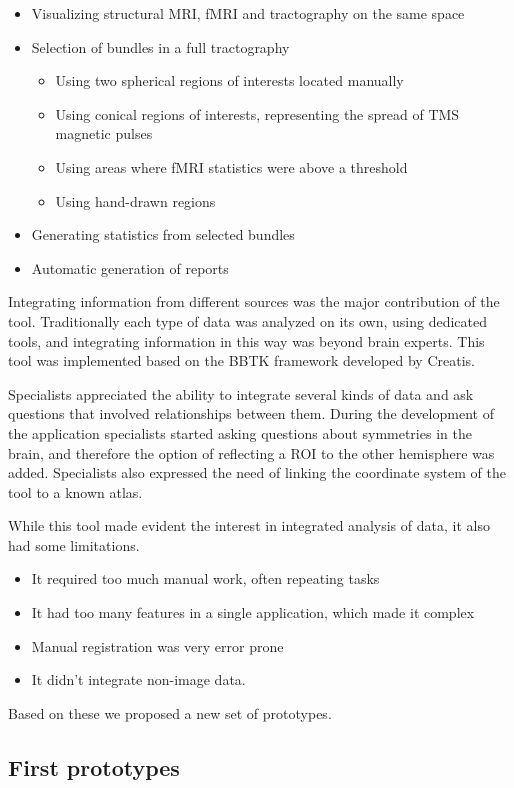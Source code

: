 \begin{itemize}
\item Visualizing structural MRI, fMRI and tractography on the same space
\item Selection of bundles in a full tractography
\begin{itemize}
\item Using two spherical regions of interests located manually
\item Using conical regions of interests, representing the spread of TMS magnetic pulses
\item Using areas where fMRI statistics were above a threshold
\item Using hand-drawn regions
\end{itemize}
\item Generating statistics from selected bundles
\item Automatic generation of reports
\end{itemize}

Integrating information from different sources was the major contribution of the tool. Traditionally each type of data was analyzed on its own, using dedicated tools, and integrating information in this way was beyond brain experts. This tool was implemented based on the BBTK framework \autocite{hoyos_creatools} developed by Creatis. 

Specialists appreciated the ability to integrate several kinds of data and ask questions that involved relationships between them. During the development of the application specialists started asking questions about symmetries in the brain, and therefore the option of reflecting a ROI to the other hemisphere was added. Specialists also expressed the need of linking the coordinate system of the tool to a known atlas.

While this tool made evident the interest in integrated analysis of data, it also had some limitations.
\begin{itemize}
\item It required too much manual work, often repeating tasks
\item It had too many features in a single application, which made it complex
\item Manual registration was very error prone
\item It didn't integrate non-image data.
\end{itemize}
Based on these we proposed a new set of prototypes.

\subsection{First prototypes}

